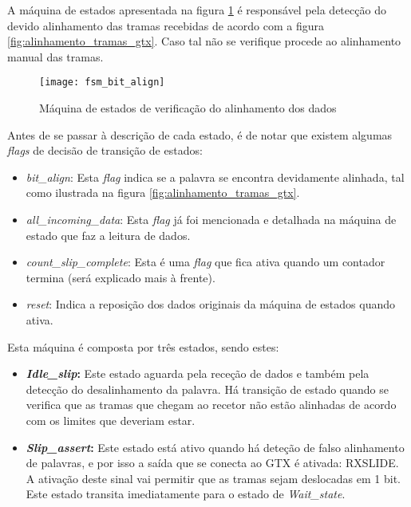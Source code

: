 \begin{enumerate}
	A máquina de estados apresentada na figura \ref{fig:fsm3} é responsável pela detecção do devido alinhamento das tramas recebidas de acordo com a figura \ref{fig:alinhamento_tramas_gtx}. Caso tal não se verifique procede ao alinhamento manual das tramas.
	
		\begin{figure}[h!]
			\begin{center}
				\leavevmode
				\texttt{[image: fsm\_bit\_align]}
				\captionsetup{width=1.0\linewidth}
				\caption[Máquina de estados de verificação do alinhamento dos dados]{Máquina de estados de verificação do alinhamento dos dados}
				\label{fig:fsm3}
		\end{center}
	\end{figure}
	
	Antes de se passar à descrição de cada estado, é de notar que existem algumas \textit{flags} de decisão de transição de estados:
	\begin{itemize}
		\item \textit{bit\_align}: Esta \textit{flag} indica se a palavra se encontra devidamente alinhada, tal como ilustrada na figura \ref{fig:alinhamento_tramas_gtx}. 
		
		\item \textit{all\_incoming\_data}: Esta \textit{flag} já foi mencionada e detalhada na máquina de estado que faz a leitura de dados.
		
		\item \textit{count\_slip\_complete}: Esta é uma \textit{flag} que fica ativa quando um contador termina (será explicado mais à frente).
		
		\item \textit{reset}: Indica a reposição dos dados originais da máquina de estados quando ativa.
	\end{itemize}
	
	
	Esta máquina é composta por três estados, sendo estes:
	\begin{itemize}
		\item \textbf{\textit{Idle\_slip}:} Este estado aguarda pela receção de dados e também pela detecção do desalinhamento da palavra. Há transição de estado quando se verifica que as tramas que chegam ao recetor não estão alinhadas de acordo com os limites que deveriam estar.
		
		\item \textbf{\textit{Slip\_assert}:} Este estado está ativo quando há deteção de falso alinhamento de palavras, e por isso a saída que se conecta ao GTX é ativada: RXSLIDE. A ativação deste sinal vai permitir que as tramas sejam deslocadas em 1 bit. Este estado transita imediatamente para o estado de \textit{Wait\_state}.
		

\end{itemize}
\end{enumerate}
